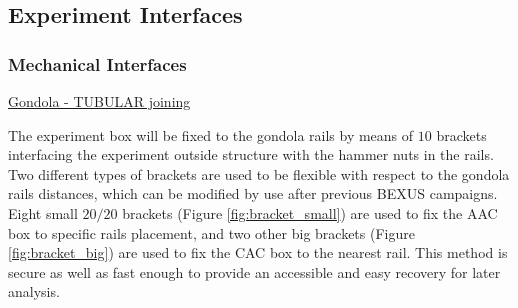 \subsection{Experiment Interfaces}

\subsubsection{Mechanical Interfaces}
\label{sec:4.2.1}

\bigskip


\underline{Gondola - TUBULAR joining}

\smallskip
The experiment box will be fixed to the gondola rails by means of $10$ brackets interfacing the experiment outside structure with the hammer nuts in the rails. Two different types of brackets are used to be flexible with respect to the gondola rails distances, which can be modified by use after previous BEXUS campaigns. Eight small $20/20$ brackets (Figure \ref{fig:bracket_small}) are used to fix the AAC box to specific rails placement, and two other big brackets (Figure \ref{fig:bracket_big}) are used to fix the CAC box to the nearest rail. This method is secure as well as fast enough to provide an accessible and easy recovery for later analysis.

